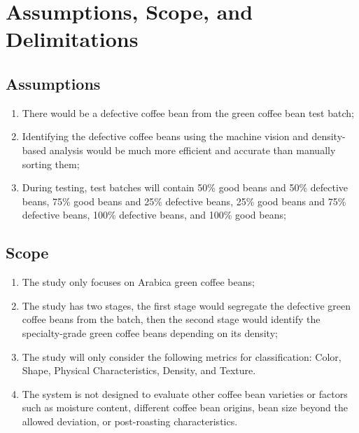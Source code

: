 \section{Assumptions, Scope, and Delimitations}

\subsection{Assumptions}

\begin{enumerate}
	\item There would be a defective coffee bean from the green coffee bean test batch;
	
	\item Identifying the defective coffee beans using the machine vision and density-based analysis would be much more efficient and accurate than manually sorting them;
	
	\item During testing, test batches will contain 50\% good beans and 50\% defective beans, 75\% good beans and 25\% defective beans, 25\% good beans and 75\% defective beans, 100\% defective beans, and 100\% good beans;	
\end{enumerate}

\subsection{Scope}
\begin{enumerate}
	\item The study only focuses on Arabica green coffee beans;
	
	\item The study has two stages, the first stage would segregate the defective green coffee beans from the batch, then the second stage would identify the specialty-grade green coffee beans depending on its density;

	\item The study will only consider the following metrics for classification: Color, Shape, Physical Characteristics, Density, and Texture.

	\item The system is not designed to evaluate other coffee bean varieties or factors such as moisture content, different coffee bean origins, bean size beyond the allowed deviation, or post-roasting characteristics.

\end{enumerate}

